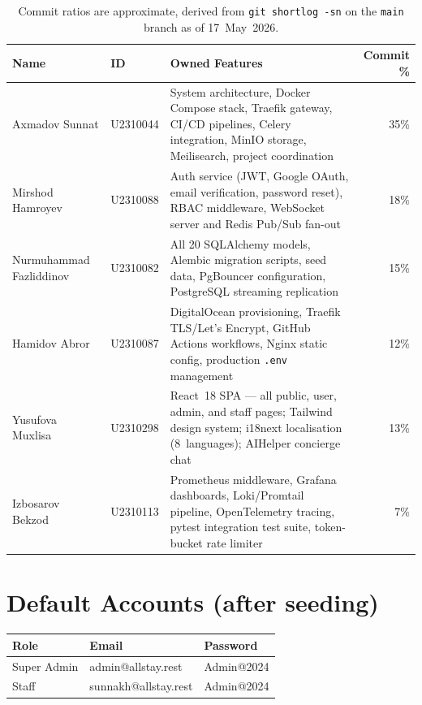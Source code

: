 \documentclass[12pt,a4paper]{article}
\begin{document}
\begin{table}[H]
\centering\small
\begin{tabularx}{\linewidth}{@{} l l X r @{}}
\toprule
\textbf{Name} & \textbf{ID} & \textbf{Owned Features} & \textbf{Commit \%} \\
\midrule
Axmadov Sunnat & U2310044
  & System architecture, Docker Compose stack, Traefik gateway, CI/CD pipelines, Celery integration, MinIO storage, Meilisearch, project coordination
  & 35\% \\[3pt]
Mirshod Hamroyev & U2310088
  & Auth service (JWT, Google OAuth, email verification, password reset), RBAC middleware, WebSocket server and Redis Pub/Sub fan-out
  & 18\% \\[3pt]
Nurmuhammad Fazliddinov & U2310082
  & All 20 SQLAlchemy models, Alembic migration scripts, seed data, PgBouncer configuration, PostgreSQL streaming replication
  & 15\% \\[3pt]
Hamidov Abror & U2310087
  & DigitalOcean provisioning, Traefik TLS/Let's Encrypt, GitHub Actions workflows, Nginx static config, production \texttt{.env} management
  & 12\% \\[3pt]
Yusufova Muxlisa & U2310298
  & React~18 SPA --- all public, user, admin, and staff pages; Tailwind design system; i18next localisation (8~languages); AIHelper concierge chat
  & 13\% \\[3pt]
Izbosarov Bekzod & U2310113
  & Prometheus middleware, Grafana dashboards, Loki/Promtail pipeline, OpenTelemetry tracing, pytest integration test suite, token-bucket rate limiter
  & 7\% \\
\bottomrule
\end{tabularx}
\caption{Commit ratios are approximate, derived from \texttt{git shortlog -sn} on the \texttt{main} branch as of 17~May~2026.}
\end{table}

\section{Default Accounts (after seeding)}

\begin{table}[H]
\centering\small
\begin{tabular}{@{} l l l @{}}
\toprule
\textbf{Role} & \textbf{Email} & \textbf{Password} \\
\midrule
Super Admin & admin@allstay.rest & Admin@2024 \\
Staff & sunnakh@allstay.rest & Admin@2024 \\
\bottomrule
\end{tabular}
\end{table}
\end{document}
